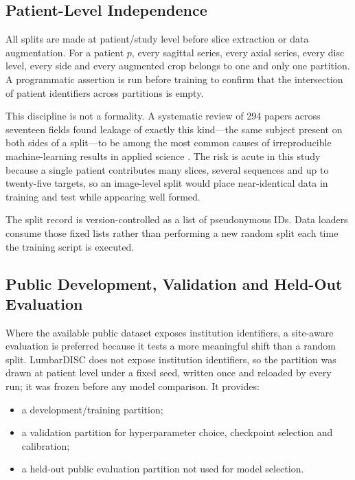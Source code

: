 \subsection{Patient-Level Independence}
\label{sec:method-patient-split}

All splits are made at patient/study level before slice extraction or data
augmentation. For a patient $p$, every sagittal series, every axial series,
every disc level, every side and every augmented crop belongs to one and only
one partition. A programmatic assertion is run before training to confirm that
the intersection of patient identifiers across partitions is empty.

This discipline is not a formality. A systematic review of 294 papers across
seventeen fields found leakage of exactly this kind---the same subject present
on both sides of a split---to be among the most common causes of irreproducible
machine-learning results in applied science \cite{kapoor2023leakage}. The risk
is acute in this study because a single patient contributes many slices,
several sequences and up to twenty-five targets, so an image-level split would
place near-identical data in training and test while appearing well formed.

The split record is version-controlled as a list of pseudonymous IDs. Data
loaders consume those fixed lists rather than performing a new random split each
time the training script is executed.

\subsection{Public Development, Validation and Held-Out Evaluation}
\label{sec:method-public-split}

Where the available public dataset exposes institution identifiers, a
site-aware evaluation is preferred because it tests a more meaningful shift
than a random split. LumbarDISC does not expose institution identifiers, so
the partition was drawn at patient level under a fixed seed, written once and
reloaded by every run; it was frozen before any model comparison. It provides:

\begin{itemize}
  \item a development/training partition;
  \item a validation partition for hyperparameter choice, checkpoint
        selection and calibration;
  \item a held-out public evaluation partition not used for model selection.
\end{itemize}

